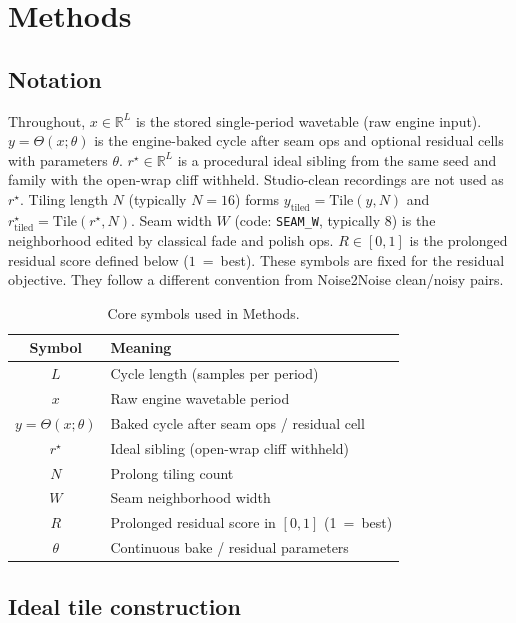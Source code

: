 \section{Methods}
\label{sec:methods}

\subsection{Notation}
\label{sec:notation}

Throughout, $x\in\mathbb{R}^{L}$ is the stored single-period wavetable (raw engine input).
$y=\Theta(x;\theta)$ is the engine-baked cycle after seam ops and optional residual cells with parameters $\theta$.
$r^{\star}\in\mathbb{R}^{L}$ is a procedural ideal sibling from the same seed and family with the open-wrap cliff withheld.
Studio-clean recordings are not used as $r^{\star}$.
Tiling length $N$ (typically $N{=}16$) forms $y_{\mathrm{tiled}}=\mathrm{Tile}(y,N)$ and $r^{\star}_{\mathrm{tiled}}=\mathrm{Tile}(r^{\star},N)$.
Seam width $W$ (code: \texttt{SEAM\_W}, typically $8$) is the neighborhood edited by classical fade and polish ops.
$R\in[0,1]$ is the prolonged residual score defined below ($1$~=~best).
These symbols are fixed for the residual objective. They follow a different convention from Noise2Noise clean/noisy pairs.

\begin{table}[t]
  \centering
  \caption{Core symbols used in Methods.}
  \label{tab:symbols}
  \setlength{\tabcolsep}{3pt}
  \begin{tabular}{@{}cl@{}}
    \toprule
    Symbol & Meaning \\
    \midrule
    $L$ & Cycle length (samples per period) \\
    $x$ & Raw engine wavetable period \\
    $y=\Theta(x;\theta)$ & Baked cycle after seam ops / residual cell \\
    $r^{\star}$ & Ideal sibling (open-wrap cliff withheld) \\
    $N$ & Prolong tiling count \\
    $W$ & Seam neighborhood width \\
    $R$ & Prolonged residual score in $[0,1]$ (1~=~best) \\
    $\theta$ & Continuous bake / residual parameters \\
    \bottomrule
  \end{tabular}
\end{table}

\subsection{Ideal tile construction}
\label{sec:ideal-tile}

